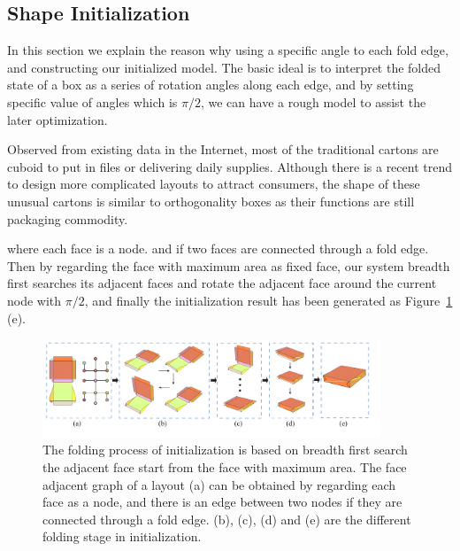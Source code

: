 \subsection{Shape Initialization}\label{sec:initialization}


In this section we explain the reason why using a specific angle to each fold edge, and constructing our initialized model. The basic ideal is to interpret the folded state of a box as a series of rotation angles along each edge, and by setting specific value of angles which is $\pi/2$, we can have a rough model to assist the later optimization.
		
Observed from existing data in the Internet, most of the traditional cartons are cuboid to put in files or delivering daily supplies. Although there is a recent trend to design more complicated layouts to attract consumers, the shape of these unusual cartons is similar to orthogonality boxes as their functions are still packaging commodity. 


{ where each face is a node. and if two faces are connected through a fold edge. Then by regarding the face with maximum area as fixed face, our system breadth first searches its adjacent faces and rotate the adjacent face around the current node with $\pi/2$, and finally the initialization result has been generated as Figure~\ref{fig:midresult} (e).} 

\begin{figure}[ht]
	\centering
	\includegraphics[width=0.9\textwidth]{images/midresult}
	\caption{The folding process of initialization is based on breadth first search the adjacent face start from the face with maximum area. The face adjacent graph of a layout (a) can be obtained by regarding each face as a node, and there is an edge between two nodes if they are connected through a fold edge. (b), (c), (d) and (e) are the different folding stage in initialization.}
	\label{fig:midresult}
\end{figure}

